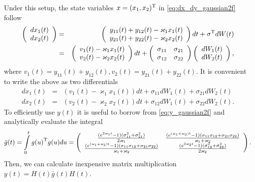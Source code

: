 \documentclass[11pt,a4paper]{article}
\theoremstyle{break} %
\numberwithin{equation}{section}
\begin{document}
Under this setup, the state variables $x = {({x_1},{x_2})^{\rm{T}}}$ in \eqref{eq:dx_dy_gaussian2f} follow 
\begin{eqnarray*}
\left( {\begin{array}{*{20}{c}}
{d{x_1}(t)}\\
{d{x_2}(t)}
\end{array}} \right) &=& \left( {\begin{array}{*{20}{c}}
{{y_{11}}(t) + {y_{12}}(t) - {\varkappa _1}{x_1}(t)}\\
{{y_{21}}(t) + {y_{22}}(t) - {\varkappa _2}{x_2}(t)}
\end{array}} \right)dt + {\sigma ^{\rm{T}}}dW(t)\\
 &=& \left( {\begin{array}{*{20}{c}}
{{v_1}(t) - {\varkappa _1}{x_1}(t)}\\
{{v_2}(t) - {\varkappa _2}{x_2}(t)}
\end{array}} \right)dt + \left( {\begin{array}{*{20}{c}}
{{\sigma _{11}}}&{{\sigma _{21}}}\\
{{\sigma _{12}}}&{{\sigma _{22}}}
\end{array}} \right)\left( {\begin{array}{*{20}{c}}
{d{W_1}(t)}\\
{d{W_2}(t)}
\end{array}} \right),
\end{eqnarray*}
where ${v_1}(t) = {y_{11}}(t) + {y_{12}}(t),{v_2}(t) = {y_{21}}(t) + {y_{22}}(t)$.
It is convenient to write the above as two differentials
\begin{eqnarray*}
d{x_1}(t) &=& \left( {{v_1}(t) - {\varkappa _1}{x_1}(t)} \right)dt + {\sigma _{11}}d{W_1}(t) + {\sigma _{21}}d{W_2}(t)\\
d{x_2}(t) &=& \left( {{v_2}(t) - {\varkappa _2}{x_2}(t)} \right)dt + {\sigma _{12}}d{W_1}(t) + {\sigma _{22}}d{W_2}(t).
\end{eqnarray*}
To efficiently use $y(t)$ it is useful to borrow from \eqref{eq:y_gaussian2f} and analytically evaluate the integral 
\begin{equation*}
\bar g(t) = \int\limits_0^t {g{{(u)}^{\rm{T}}}g(u)du}  = \left( {\begin{array}{*{20}{c}}
{\frac{{({e^{2{\varkappa_1}t}} - 1)(\sigma _{11}^2 + \sigma _{21}^2)}}{{2{\varkappa_1}}}}&{\frac{{({e^{({\varkappa_1} + {\varkappa_2})t}} - 1)({\sigma _{11}}{\sigma _{12}} + {\sigma _{21}}{\sigma _{22}})}}{{{\varkappa_1} + {\varkappa_2}}}}\\
{\frac{{({e^{({\varkappa_1} + {\varkappa_2})t}} - 1)({\sigma _{11}}{\sigma _{12}} + {\sigma _{21}}{\sigma _{22}})}}{{{\varkappa_1} + {\varkappa_2}}}}&{\frac{{({e^{2{\varkappa_2}t}} - 1)(\sigma _{12}^2 + \sigma _{22}^2)}}{{2{\varkappa_2}}}}
\end{array}} \right).
\end{equation*}
Then, we can calculate inexpensive matrix multiplication $y(t) = H(t)\bar g(t)H(t)$.
\end{document}
